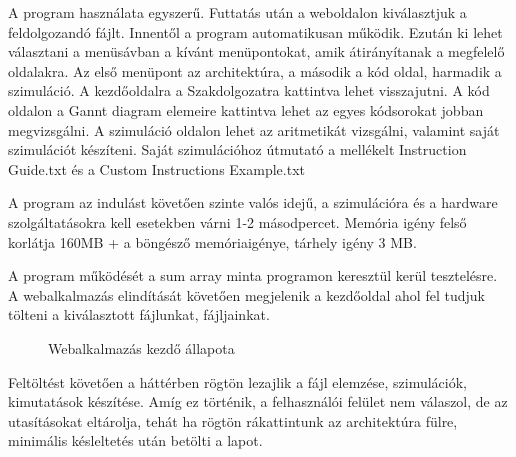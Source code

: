 
A program használata egyszerű. Futtatás után a weboldalon kiválasztjuk a feldolgozandó fájlt. Innentől a program automatikusan működik. Ezután ki lehet választani a menüsávban a kívánt menüpontokat, amik átirányítanak a megfelelő oldalakra. Az első menüpont az architektúra, a második a kód oldal, harmadik a szimuláció. A kezdőoldalra a Szakdolgozatra kattintva lehet visszajutni. A kód oldalon a Gannt diagram elemeire kattintva lehet az egyes kódsorokat jobban megvizsgálni. A szimuláció oldalon lehet az aritmetikát vizsgálni, valamint saját szimulációt készíteni. Saját szimulációhoz útmutató a mellékelt Instruction Guide.txt és a Custom Instructions Example.txt

A program az indulást követően szinte valós idejű, a szimulációra és a hardware szolgáltatásokra kell esetekben várni 1-2 másodpercet. Memória igény felső korlátja 160MB + a böngésző memóriaigénye, tárhely igény 3 MB.

A program működését a sum array minta programon keresztül kerül tesztelésre. A webalkalmazás elindítását követően megjelenik a kezdőoldal ahol fel tudjuk tölteni a kiválasztott fájlunkat, fájljainkat.

\begin{figure}[h]
\centering
{}
\caption{Webalkalmazás kezdő állapota}
\label{fig:start}
\end{figure}

\newpage
Feltöltést követően a háttérben rögtön lezajlik a fájl elemzése, szimulációk, kimutatások készítése. Amíg ez történik, a felhasználói felület nem válaszol, de az utasításokat eltárolja, tehát ha rögtön rákattintunk az architektúra fülre, minimális késleltetés után betölti a lapot.

